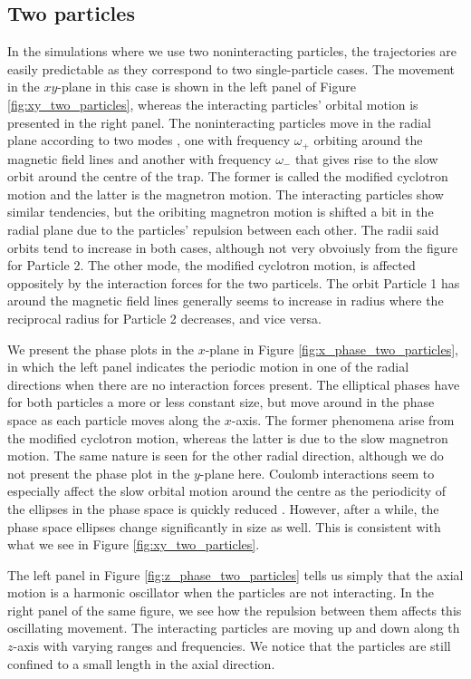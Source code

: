\subsection{Two particles}


In the simulations where we use two noninteracting particles, the trajectories are easily predictable as they correspond to two single-particle cases. The movement in the $xy$-plane in this case is shown in the left panel of Figure \ref{fig:xy_two_particles}, whereas the interacting particles' orbital motion is presented in the right panel. The noninteracting particles move in the radial plane according to two modes , one with frequency $\omega_+$ orbiting around the magnetic field lines and another with frequency $\omega_-$ that gives rise to the slow orbit around the centre of the trap. The former is called the modified cyclotron motion and the latter is the magnetron motion. The interacting particles show similar tendencies, but the oribiting magnetron motion is shifted a bit in the radial plane due to the particles' repulsion between each other. The radii said orbits tend to increase in both cases, although not very obvoiusly from the figure for Particle 2. The other mode, the modified cyclotron motion, is affected oppositely by the interaction forces for the two particels. The orbit Particle 1 has around the magnetic field lines generally seems to increase in radius where the reciprocal radius for Particle 2 decreases, and vice versa.

We present the phase plots in the $x$-plane in Figure \ref{fig:x_phase_two_particles}, in which the left panel indicates the periodic motion in one of the radial directions when there are no interaction forces present. The elliptical phases have for both particles a more or less constant size, but move around in the phase space as each particle moves along the $x$-axis. The former phenomena arise from the modified cyclotron motion, whereas the latter is due to the slow magnetron motion. The same nature is seen for the other radial direction, although we do not present the phase plot in the $y$-plane here. Coulomb interactions seem to especially affect the slow orbital motion around the centre as the periodicity of the ellipses in the phase space is quickly reduced . However, after a while, the phase space ellipses change significantly in size as well. This is consistent with what we see in Figure \ref{fig:xy_two_particles}.  

The left panel in Figure \ref{fig:z_phase_two_particles} tells us simply that the axial motion is a harmonic oscillator  when the particles are not interacting. In the right panel of the same figure, we see how the repulsion between them affects this oscillating movement. The interacting particles are moving up and down along th $z$-axis with varying ranges and frequencies. We notice that the particles are still confined to a small length in the axial direction. 

